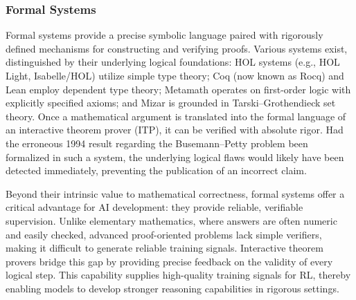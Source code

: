 \documentclass[11pt]{article}
\numberwithin{equation}{section}
\begin{document}
 
\subsubsection{Formal Systems}

Formal systems provide a precise symbolic language paired with rigorously defined mechanisms for constructing and verifying proofs. Various systems exist, distinguished by their underlying logical foundations: HOL systems (e.g., HOL Light, Isabelle/HOL) utilize simple type theory; Coq (now known as Rocq) and Lean employ dependent type theory; Metamath operates on first-order logic with explicitly specified axioms; and Mizar is grounded in Tarski–Grothendieck set theory. Once a mathematical argument is translated into the formal language of an interactive theorem prover (ITP), it can be verified with absolute rigor. Had the erroneous 1994 result regarding the Busemann--Petty problem been formalized in such a system, the underlying logical flaws would likely have been detected immediately, preventing the publication of an incorrect claim.

Beyond their intrinsic value to mathematical correctness, formal systems offer a critical advantage for AI development: they provide reliable, verifiable supervision. Unlike elementary mathematics, where answers are often numeric and easily checked, advanced proof-oriented problems lack simple verifiers, making it difficult to generate reliable training signals. Interactive theorem provers bridge this gap by providing precise feedback on the validity of every logical step. This capability supplies high-quality training signals for RL, thereby enabling models to develop stronger reasoning capabilities in rigorous settings.
\end{document}
